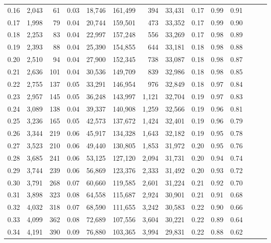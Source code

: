 \begin{tabular}{rrrrrrrrrrrrrr}
0.16 &  2,043 &   61 &  0.03 &   18,746 &  161,499 &     394 &  33,431 &  0.17 &  0.99 &      0.91 \\
0.17 &  1,998 &   79 &  0.04 &   20,744 &  159,501 &     473 &  33,352 &  0.17 &  0.99 &      0.90 \\
0.18 &  2,253 &   83 &  0.04 &   22,997 &  157,248 &     556 &  33,269 &  0.17 &  0.98 &      0.89 \\
0.19 &  2,393 &   88 &  0.04 &   25,390 &  154,855 &     644 &  33,181 &  0.18 &  0.98 &      0.88 \\
0.20 &  2,510 &   94 &  0.04 &   27,900 &  152,345 &     738 &  33,087 &  0.18 &  0.98 &      0.87 \\
0.21 &  2,636 &  101 &  0.04 &   30,536 &  149,709 &     839 &  32,986 &  0.18 &  0.98 &      0.85 \\
0.22 &  2,755 &  137 &  0.05 &   33,291 &  146,954 &     976 &  32,849 &  0.18 &  0.97 &      0.84 \\
0.23 &  2,957 &  145 &  0.05 &   36,248 &  143,997 &   1,121 &  32,704 &  0.19 &  0.97 &      0.83 \\
0.24 &  3,089 &  138 &  0.04 &   39,337 &  140,908 &   1,259 &  32,566 &  0.19 &  0.96 &      0.81 \\
0.25 &  3,236 &  165 &  0.05 &   42,573 &  137,672 &   1,424 &  32,401 &  0.19 &  0.96 &      0.79 \\
0.26 &  3,344 &  219 &  0.06 &   45,917 &  134,328 &   1,643 &  32,182 &  0.19 &  0.95 &      0.78 \\
0.27 &  3,523 &  210 &  0.06 &   49,440 &  130,805 &   1,853 &  31,972 &  0.20 &  0.95 &      0.76 \\
0.28 &  3,685 &  241 &  0.06 &   53,125 &  127,120 &   2,094 &  31,731 &  0.20 &  0.94 &      0.74 \\
0.29 &  3,744 &  239 &  0.06 &   56,869 &  123,376 &   2,333 &  31,492 &  0.20 &  0.93 &      0.72 \\
0.30 &  3,791 &  268 &  0.07 &   60,660 &  119,585 &   2,601 &  31,224 &  0.21 &  0.92 &      0.70 \\
0.31 &  3,898 &  323 &  0.08 &   64,558 &  115,687 &   2,924 &  30,901 &  0.21 &  0.91 &      0.68 \\
0.32 &  4,032 &  318 &  0.07 &   68,590 &  111,655 &   3,242 &  30,583 &  0.22 &  0.90 &      0.66 \\
0.33 &  4,099 &  362 &  0.08 &   72,689 &  107,556 &   3,604 &  30,221 &  0.22 &  0.89 &      0.64 \\
0.34 &  4,191 &  390 &  0.09 &   76,880 &  103,365 &   3,994 &  29,831 &  0.22 &  0.88 &      0.62 \\

\end{tabular}
